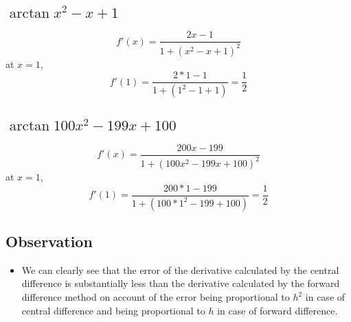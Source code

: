 \documentclass{article}
\begin{document}
\subsection{$\arctan{x^2-x+1}$}
$$f'(x) = \frac{2x-1}{1+(x^2-x+1)^2}$$
at $x = 1$, $$f'(1) = \frac{2*1-1}{1+(1^2-1+1)} = \frac{1}{2}$$
\begin{table}[h!]
\end{table}

\newpage
\subsection{$\arctan{100x^2-199x+100}$}
$$f'(x) = \frac{200x-199}{1+(100x^2-199x+100)^2}$$
at $x = 1$, $$f'(1) = \frac{200*1-199}{1+(100*1^2-199+100)} = \frac{1}{2}$$
\begin{table}[h!]
\end{table}
\subsection{Observation}
\begin{itemize}
    \item We can clearly see that the error of the derivative calculated by the central difference is substantially less than the derivative calculated by the forward difference method on account of the error being proportional to $h^2$ in case of central difference and being proportional to $h$ in case of forward difference.
\end{itemize}
\end{document}
